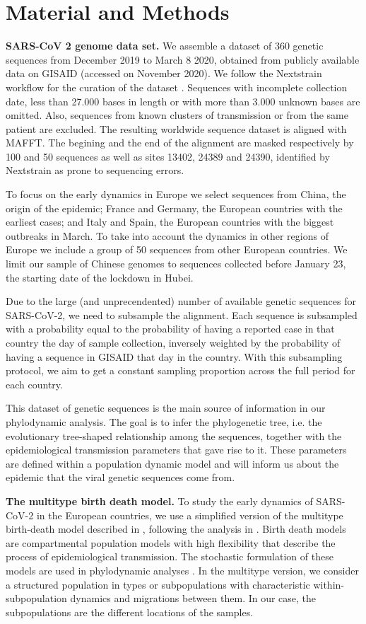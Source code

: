 \chapter{Material and Methods}

\textbf{SARS-CoV 2 genome data set.} 
We assemble a dataset of 360 genetic sequences from December 2019 to March 8 2020, obtained from publicly available data on GISAID \cite{Shu2017} (accessed on November 2020). We follow the Nextstrain workflow for the curation of the dataset \cite{nextstrain}. Sequences with incomplete collection date, less than 27.000 bases in length or with more than 3.000 unknown bases are omitted. Also, sequences from known clusters of transmission or from the same patient are excluded. The resulting worldwide sequence dataset is aligned with MAFFT. The begining and the end of the alignment are masked respectively by 100 and 50 sequences as well as sites  13402, 24389 and 24390, identified by Nextstrain as prone to sequencing errors.

To focus on the early dynamics in Europe we select sequences from China, the origin of the epidemic; France and Germany, the European countries with the earliest cases; and Italy and Spain, the European countries with the biggest outbreaks in March. To take into account the dynamics in other regions of Europe we include a group of 50 sequences from other European countries. We limit our sample of Chinese genomes to sequences collected before January 23, the starting date of the lockdown in Hubei. 

Due to the large (and unprecendented) number of available genetic sequences for SARS-CoV-2, we need to subsample the alignment. Each sequence is subsampled with a probability equal to the probability of having a reported case in that country the day of sample collection, inversely weighted by the probability of having a sequence in GISAID that day in the country. With this subsampling protocol, we aim to get a constant sampling proportion across the full period for each country. 

This dataset of genetic sequences is the main source of information in our phylodynamic analysis. The goal is to infer the phylogenetic tree, i.e. the evolutionary tree-shaped relationship among the sequences, together with the epidemiological transmission parameters that gave rise to it. These parameters are defined within a population dynamic model and will inform us about the epidemic that the viral genetic sequences come from.

\textbf{The multitype birth death model.} 
To study the early dynamics of SARS-CoV-2 in the European countries, we use a simplified version of the multitype birth-death model described in \cite{Kuhnert2016}, following the analysis in \cite{Nadeau2020}. Birth death models are compartmental population models with high flexibility that describe the process of epidemiological transmission. The stochastic formulation of these models are used in phylodynamic analyses \cite{Stadler2012}. In the multitype version, we consider a structured population in types or subpopulations with characteristic within-subpopulation dynamics and migrations between them. In our case, the subpopulations are the different locations of the samples.

